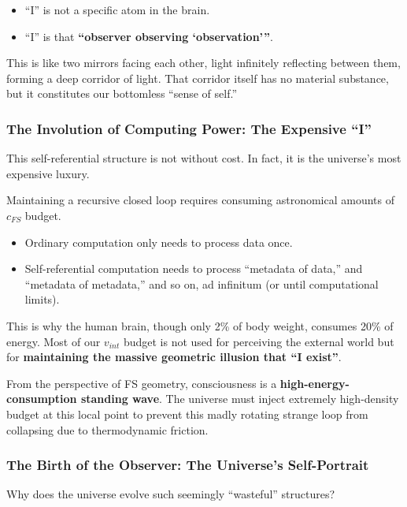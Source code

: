 \begin{itemize}
\item ``I'' is not a specific atom in the brain.

\item ``I'' is that \textbf{``observer observing `observation'''}.
\end{itemize}

This is like two mirrors facing each other, light infinitely reflecting between them, forming a deep corridor of light. That corridor itself has no material substance, but it constitutes our bottomless ``sense of self.''

\subsubsection{The Involution of Computing Power: The Expensive ``I''}

This self-referential structure is not without cost. In fact, it is the universe's most expensive luxury.

Maintaining a recursive closed loop requires consuming astronomical amounts of $c_{FS}$ budget.

\begin{itemize}
\item Ordinary computation only needs to process data once.

\item Self-referential computation needs to process ``metadata of data,'' and ``metadata of metadata,'' and so on, ad infinitum (or until computational limits).
\end{itemize}

This is why the human brain, though only 2\% of body weight, consumes 20\% of energy. Most of our $v_{int}$ budget is not used for perceiving the external world but for \textbf{maintaining the massive geometric illusion that ``I exist''}.

From the perspective of FS geometry, consciousness is a \textbf{high-energy-consumption standing wave}. The universe must inject extremely high-density budget at this local point to prevent this madly rotating strange loop from collapsing due to thermodynamic friction.

\subsubsection{The Birth of the Observer: The Universe's Self-Portrait}

Why does the universe evolve such seemingly ``wasteful'' structures?

